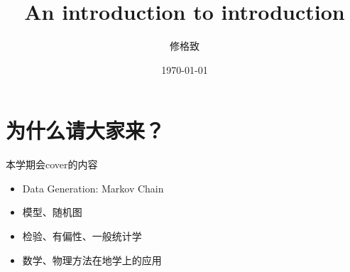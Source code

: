 \documentclass{beamer}
\title{An introduction to introduction}
\author{修格致}
\institute{IRSGIS\\ Peking University}
\date{\today}
\begin{document}
    \maketitle    


\section{为什么请大家来？}

\begin{frame}{本学期会cover的内容}
    \begin{itemize}
        \item Data Generation: Markov Chain
        \item 模型、随机图
        \item 检验、有偏性、一般统计学
        \item 数学、物理方法在地学上的应用
    \end{itemize}
\end{frame}
\end{document}
